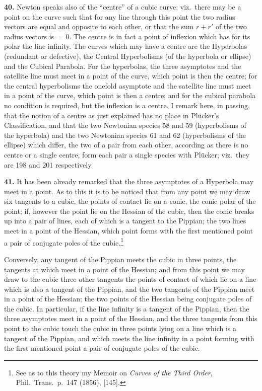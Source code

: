 \documentclass[11pt,a4paper]{article}
\begin{document}
\textbf{40.} Newton speaks also of the ``centre'' of a cubic curve; viz.\ there may be a point on the curve such that for any line through this point the two radius vectors are equal and opposite to each other, or that the sum $r + r'$ of the two radius vectors is $=0$. The centre is in fact a point of inflexion which has for its polar the line infinity. The curves which may have a centre are the Hyperbolas (redundant or defective), the Central Hyperbolisms (of the hyperbola or ellipse) and the Cubical Parabola. For the hyperbolas, the three asymptotes and the satellite line must meet in a point of the curve, which point is then the centre; for the central hyperbolisms the onefold asymptote and the satellite line must meet in a point of the curve, which point is then a centre; and for the cubical parabola no condition is required, but the inflexion is a centre. I remark here, in passing, that the notion of a centre as just explained has no place in Pl\"ucker's Classification, and that the two Newtonian species 58 and 59 (hyperbolisms of the hyperbola) and the two Newtonian species 61 and 62 (hyperbolisms of the ellipse) which differ, the two of a pair from each other, according as there is no centre or a single centre, form each pair a single species with Pl\"ucker; viz.\ they are 198 and 201 respectively.

\medskip

\textbf{41.} It has been already remarked that the three asymptotes of a Hyperbola may meet in a point. As to this it is to be noticed that from any point we may draw six tangents to a cubic, the points of contact lie on a conic, the conic polar of the point; if, however the point lie on the Hessian of the cubic, then the conic breaks up into a pair of lines, each of which is a tangent to the Pippian; the two lines meet in a point of the Hessian, which point forms with the first mentioned point a pair of conjugate poles of the cubic.\footnote{See as to this theory my Memoir on \emph{Curves of the Third Order}, Phil.\ Trans.\ p.~147 (1856), [145].}

Conversely, any tangent of the Pippian meets the cubic in three points, the tangents at which meet in a point of the Hessian; and from this point we may draw to the cubic three other tangents the points of contact of which lie on a line which is also a tangent of the Pippian, and the two tangents of the Pippian meet in a point of the Hessian; the two points of the Hessian being conjugate poles of the cubic. In particular, if the line infinity is a tangent of the Pippian, then the three asymptotes meet in a point of the Hessian, and the three tangents from this point to the cubic touch the cubic in three points lying on a line which is a tangent of the Pippian, and which meets the line infinity in a point forming with the first mentioned point a pair of conjugate poles of the cubic.
\end{document}
